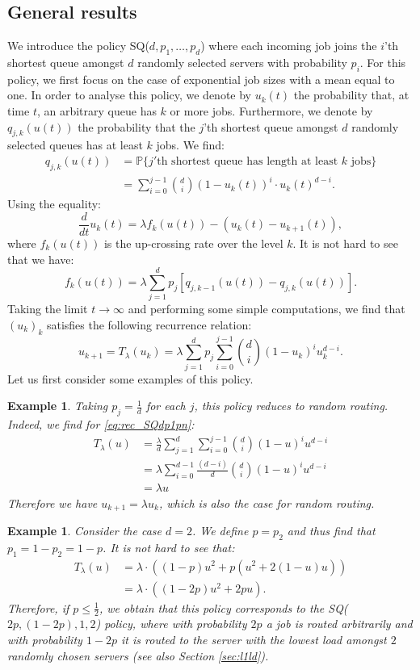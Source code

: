 \documentclass[12pt]{report}
\newtheorem{vbd}[theorem]{Example}
\begin{document}
\subsection{General results}
We introduce the policy SQ($d, p_1,\dots, p_d$) where each incoming job joins the $i$'th shortest queue amongst $d$ randomly selected servers with probability $p_i$. For this policy, we first focus on the case of exponential job sizes with a mean equal to one. In order to analyse this policy, we denote by $u_k(t)$ the probability that, at time $t$, an arbitrary queue has $k$ or more jobs. Furthermore, we denote by $q_{j,k}(u(t))$ the probability that the $j$'th shortest queue amongst $d$ randomly selected queues has at least $k$ jobs. We find:
\begin{align*}
q_{j,k}(u(t))
&= \mathbb{P}\{ j'\mbox{th shortest queue has length at least } k \mbox{ jobs} \}\\
&= \sum_{i=0}^{j-1} \binom{d}{i} (1-u_k(t))^i \cdot u_k(t)^{d-i}.
\end{align*}
Using the equality:
$$
\frac{d}{dt} u_k(t) = \lambda f_k(u(t)) - (u_k(t) - u_{k+1}(t)),
$$
where $f_k(u(t))$ is the up-crossing rate over the level $k$. 
It is not hard to see that we have:
$$
f_k(u(t)) = \lambda \sum_{j=1}^d p_j \left[ q_{j, k-1}(u(t)) - q_{j,k}(u(t)) \right].
$$
Taking the limit $t\rightarrow \infty$ and performing some simple computations, we find that $(u_k)_k$ satisfies the following recurrence relation:
\begin{equation}\label{eq:rec_SQdp1pn}
u_{k+1} = T_\lambda(u_k) = \lambda \sum_{j=1}^d p_j \sum_{i=0}^{j-1} \binom{d}{i} (1-u_k)^i u_k^{d-i}.
\end{equation}
Let us first consider some examples of this policy.
\begin{vbd}
Taking $p_j=\frac{1}{d}$ for each $j$, this policy reduces to random routing. Indeed, we find for \eqref{eq:rec_SQdp1pn}:
\begin{align*}
T_\lambda(u)
&= \frac{\lambda}{d} \sum_{j=1}^d \sum_{i=0}^{j-1} \binom{d}{i} (1-u)^i u^{d-i}\\
&= \lambda \sum_{i=0}^{d-1} \frac{(d-i)}{d} \binom{d}{i} (1-u)^i u^{d-i}\\
&= \lambda u
\end{align*}
Therefore we have $u_{k+1} = \lambda u_k$, which is also the case for random routing.
\end{vbd}
\begin{vbd} \label{example:d=2_SQdp1pn}
Consider the case $d=2$. We define $p=p_2$ and thus find that $p_1=1-p_2=1-p$. It is not hard to see that:
\begin{align*}
T_\lambda(u)
&= \lambda \cdot \left( (1-p) u^2 + p (u^2 + 2 (1-u) u ) \right)\\
&= \lambda \cdot \left( (1-2p) u^2 + 2p u \right).
\end{align*}
Therefore, if $p \leq \frac{1}{2}$, we obtain that this policy corresponds to the SQ($2p, (1-2p), 1, 2$) policy, where with probability $2p$ a job is routed arbitrarily and with probability $1-2p$ it is routed to the server with the lowest load amongst $2$ randomly chosen servers (see also Section \ref{sec:l1ld}). 
\end{vbd}
\end{document}
